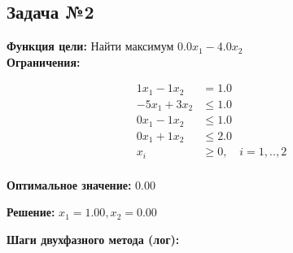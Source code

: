 \documentclass[a4paper,12pt]{article}
\begin{document}
\subsection*{Задача №2}
\textbf{Функция цели: }
Найти максимум $ 0.0x_{1} -4.0x_{2} $\\

\textbf{Ограничения:}

\[ \begin{aligned}
1x_{1} -1x_{2} &= 1.0 \\
-5x_{1} +3x_{2} &\le 1.0 \\
0x_{1} -1x_{2} &\le 1.0 \\
0x_{1} +1x_{2} &\le 2.0 \\
x_i &\ge 0,\quad i=1,..,2\\
\end{aligned}\]

\textbf{Оптимальное значение: }$0.00$

\textbf{Решение: }$x_{1}=1.00, x_{2}=0.00$

\textbf{Шаги двухфазного метода (лог):}
\end{document}
